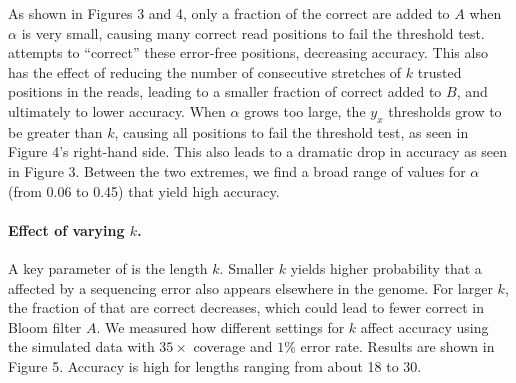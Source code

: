 \documentclass{bmcart}
\begin{document}
As shown in Figures 3 and 4, only a fraction of the correct \kmers are added to $A$ when $\alpha$ is very small, causing many correct read positions to fail the threshold test.  \tool attempts to ``correct'' these error-free positions, decreasing accuracy.  This also has the effect of reducing the number of consecutive stretches of $k$ trusted positions in the reads, leading to a smaller fraction of correct \kmers added to $B$, and ultimately to lower accuracy.  When $\alpha$ grows too large, the $y_x$ thresholds grow to be greater than $k$, causing all positions to fail the threshold test, as seen in Figure 4's right-hand side.  This also leads to a dramatic drop in accuracy as seen in Figure 3.  Between the two extremes, we find a broad range of values for $\alpha$ (from 0.06 to 0.45) that yield high accuracy.







\paragraph{Effect of varying $k$.}  
A key parameter of \tool is the \kmer length $k$.  Smaller $k$ yields higher probability that a \kmer affected by a sequencing error also appears elsewhere in the genome.  For larger $k$, the fraction of \kmers that are correct decreases, which could lead to fewer correct \kmer in Bloom filter $A$.  We measured how different settings for $k$ affect accuracy using the simulated data with $35\times$ coverage and $1\%$ error rate.  Results are shown in Figure 5.  Accuracy is high for \kmer lengths ranging from about 18 to 30.
\end{document}
